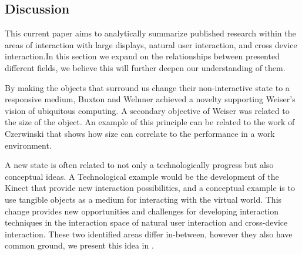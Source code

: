 \subsection{Discussion}
This current paper aims to analytically summarize published research within the areas of interaction with large displays, natural user interaction, and cross device interaction.In this section we expand on the relationships between presented different fields, we believe this will further deepen our understanding of them.

By making the objects that surround us change their non-interactive state to a responsive medium, Buxton and Welnner achieved a novelty supporting Weiser's vision of ubiquitous computing. A secondary objective of Weiser was related to the size of the object. An example of this principle can be related to the work of Czerwinski that shows how size can correlate to the performance in a work environment.

A new state is often related to not only a technologically progress but also conceptual ideas. A Technological example would be the development of the Kinect that provide new interaction possibilities\cite{Wilson:2010}, and a conceptual example is to use tangible objects as a medium for interacting with the virtual world\cite{Rekimoto:1997, Keefe:2001}.
This change provides new opportunities and challenges for developing interaction techniques in the interaction space of natural user interaction and cross-device interaction. These two identified areas differ in-between, however they also have common ground, we present this idea in .\\

